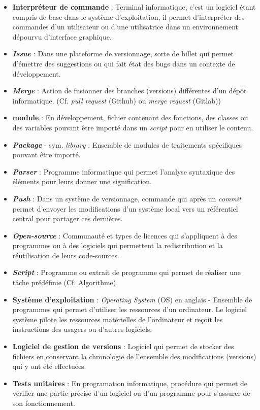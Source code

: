 \begin{itemize}
    \item \textbf{Interpréteur de commande} : Terminal informatique, c'est un logiciel étant compris de base dans le système d'exploitation, il permet d'interpréter des commandes d'un utilisateur ou d'une utilisatrice dans un environnement dépourvu d'interface graphique.
    \item \textbf{\textit{Issue}} : Dans une plateforme de versionnage, sorte de billet qui permet d'émettre des suggestions ou qui fait état des bugs dans un contexte de développement. 
    \item \textbf{\textit{Merge}} : Action de fusionner des branches (versions) différentes d'un dépôt informatique. (Cf. \textit{pull request} (Github) ou \textit{merge request} (Gitlab))
    \item \textbf{module} : En développement, fichier contenant des fonctions, des classes ou des variables pouvant être importé dans un \textit{script} pour en utiliser le contenu.
    \item \textbf{\textit{Package}} - sym. \textit{library} : Ensemble de modules de traitements spécifiques pouvant être importé.
    \item \textbf{\textit{Parser}} :  Programme informatique qui permet l'analyse syntaxique des éléments pour leurs donner une signification. 
    \item \textbf{\textit{Push}} : Dans un système de versionnage, commande qui après un \textit{commit} permet d'envoyer les modifications d'un système local vers un référentiel central pour partager ces dernières.
    \item \textbf{\textit{Open-source}} : Communauté et types de licences qui s'appliquent à des programmes ou à des logiciels qui permettent la redistribution et la réutilisation de leurs code-sources.  
    \item \textbf{\textit{Script}} : Programme ou extrait de programme qui permet de réaliser une tâche prédéfinie (Cf. Algorithme). 
    \item \textbf{Système d'exploitation} : \textit{Operating System} (OS) en anglais - Ensemble de programmes qui permet d'utiliser les ressources d'un ordinateur. Le logiciel système pilote les ressources matérielles de l'ordinateur et reçoit les instructions des usagers ou d'autres logiciels.
    \item \textbf{Logiciel de gestion de versions} : Logiciel qui permet de stocker des fichiers en conservant la chronologie de l'ensemble des modifications (versions) qui y ont été effectuées.
    \item \textbf{Tests unitaires} : En programation informatique, procédure qui permet de vérifier une partie précise d'un logiciel ou d'un programme pour s'assurer de son fonctionnement.
\end{itemize}
